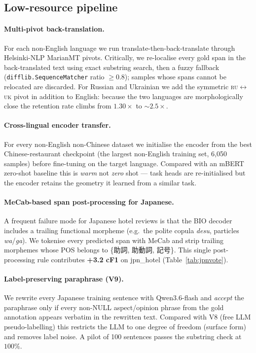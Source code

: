\documentclass[11pt]{article}
\begin{document}
\subsection{Low-resource pipeline}
\label{sec:method:lowres}

\paragraph{Multi-pivot back-translation.}
For each non-English language we run translate-then-back-translate
through Helsinki-NLP MarianMT pivots. Critically, we re-localise every
gold span in the back-translated text using exact substring search,
then a fuzzy fallback (\texttt{difflib.SequenceMatcher} ratio
$\geq 0.8$); samples whose spans cannot be relocated are discarded.
For Russian and Ukrainian we add the symmetric \textsc{ru$\leftrightarrow$uk}
pivot in addition to English: because the two languages are
morphologically close the retention rate climbs from
$1.30\times$ to $\sim$$2.5\times$.

\paragraph{Cross-lingual encoder transfer.}
For every non-English non-Chinese dataset we initialise the encoder
from the best Chinese-restaurant checkpoint (the largest non-English
training set, 6{,}050 samples) before fine-tuning on the target
language. Compared with an mBERT zero-shot baseline this is
\emph{warm} not \emph{zero} shot — task heads are re-initialised but
the encoder retains the geometry it learned from a similar task.

\paragraph{MeCab-based span post-processing for Japanese.}
A frequent failure mode for Japanese hotel reviews is that the BIO
decoder includes a trailing functional morpheme (e.g.\ the polite
copula \emph{desu}, particles \emph{wa}/\emph{ga}). We tokenise every
predicted span with MeCab \cite{kudo2004mecab} and strip trailing
morphemes whose POS belongs to
\{\textsc{助詞}, \textsc{助動詞}, \textsc{記号}\}.
This single post-processing rule contributes
\textbf{+3.2 cF1} on jpn\_hotel (Table~\ref{tab:jpnvote}).

\paragraph{Label-preserving paraphrase (V9).}
We rewrite every Japanese training sentence with Qwen3.6-flash and
\emph{accept} the paraphrase only if every non-NULL aspect/opinion
phrase from the gold annotation appears verbatim in the rewritten
text. Compared with V8 (free LLM pseudo-labelling) this restricts the
LLM to one degree of freedom (surface form) and removes label noise.
A pilot of 100 sentences passes the substring check at $100\%$.
\end{document}
